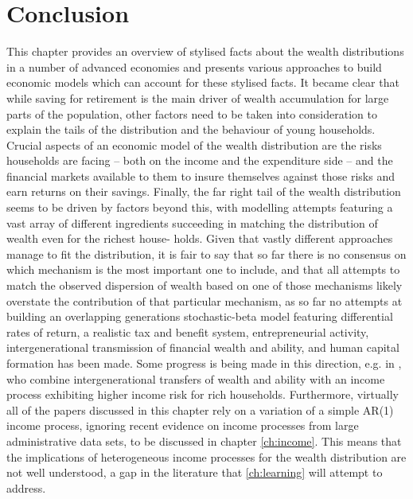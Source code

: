 \section{Conclusion}
This chapter provides an overview of stylised facts about the wealth 
distributions in a number of advanced economies and presents various approaches 
to build economic models which can account for these stylised facts.
It became clear that while saving for retirement is the main driver of wealth
accumulation for large parts of the population, other factors need to be taken
into consideration to explain the tails of the distribution and the behaviour of
young households. Crucial aspects of an economic model of the wealth 
distribution are the risks households are facing -- both on the income and the 
expenditure side -- and the financial markets available to them to insure 
themselves against those risks and earn returns on their savings. Finally, the 
far right tail of the wealth distribution seems to be driven by factors beyond 
this, with modelling attempts featuring a vast array of different ingredients 
succeeding in matching the distribution of wealth even for the richest house-
holds. Given that vastly different approaches manage to fit the distribution, it
is fair to say that so far there is no consensus on which mechanism is the most
important one to include, and that all attempts to match the observed dispersion
of wealth based on one of those mechanisms likely overstate the contribution of 
that particular mechanism, as so far no attempts at building an overlapping 
generations stochastic-beta model featuring differential rates of return, a 
realistic tax and benefit system, entrepreneurial activity, intergenerational 
transmission of financial wealth and ability, and human capital formation has 
been made. Some progress is being made in this direction, e.g. in 
\citet{DeNardiYang2015}, who combine intergenerational transfers of wealth and
ability with an income process exhibiting higher income risk for rich households.
Furthermore, virtually all of the papers discussed in this chapter 
rely on a variation of a simple AR(1) income process, ignoring recent evidence
on income processes from large administrative data sets, to be discussed in 
chapter \ref{ch:income}. This means that the implications of heterogeneous income
processes for the wealth distribution are not well understood, a gap in the 
literature that \ref{ch:learning} will attempt to address. 